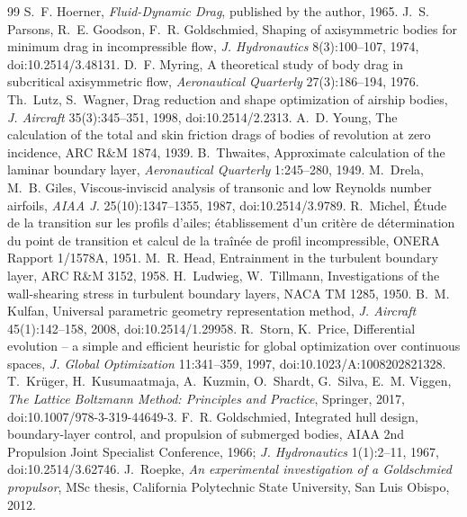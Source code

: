 \documentclass[11pt,a4paper]{article}
\begin{document}
\begin{thebibliography}{99}
 S.~F. Hoerner, \emph{Fluid-Dynamic Drag}, published by the author, 1965.
 J.~S. Parsons, R.~E. Goodson, F.~R. Goldschmied, Shaping of axisymmetric
bodies for minimum drag in incompressible flow, \emph{J. Hydronautics} 8(3):100--107, 1974,
doi:10.2514/3.48131.
 D.~F. Myring, A theoretical study of body drag in subcritical axisymmetric
flow, \emph{Aeronautical Quarterly} 27(3):186--194, 1976.
 Th.~Lutz, S.~Wagner, Drag reduction and shape optimization of airship bodies,
\emph{J. Aircraft} 35(3):345--351, 1998, doi:10.2514/2.2313.
 A.~D. Young, The calculation of the total and skin friction drags of bodies
of revolution at zero incidence, ARC R\&M 1874, 1939.
 B.~Thwaites, Approximate calculation of the laminar boundary layer,
\emph{Aeronautical Quarterly} 1:245--280, 1949.
 M.~Drela, M.~B. Giles, Viscous-inviscid analysis of transonic and low
Reynolds number airfoils, \emph{AIAA J.} 25(10):1347--1355, 1987, doi:10.2514/3.9789.
 R.~Michel, \'Etude de la transition sur les profils d'ailes; \'etablissement
d'un crit\`ere de d\'etermination du point de transition et calcul de la tra\^in\'ee de profil
incompressible, ONERA Rapport 1/1578A, 1951.
 M.~R. Head, Entrainment in the turbulent boundary layer, ARC R\&M 3152, 1958.
 H.~Ludwieg, W.~Tillmann, Investigations of the wall-shearing stress in
turbulent boundary layers, NACA TM 1285, 1950.
 B.~M. Kulfan, Universal parametric geometry representation method,
\emph{J. Aircraft} 45(1):142--158, 2008, doi:10.2514/1.29958.
 R.~Storn, K.~Price, Differential evolution -- a simple and efficient
heuristic for global optimization over continuous spaces, \emph{J. Global Optimization}
11:341--359, 1997, doi:10.1023/A:1008202821328.
 T.~Kr\"uger, H.~Kusumaatmaja, A.~Kuzmin, O.~Shardt, G.~Silva, E.~M. Viggen,
\emph{The Lattice Boltzmann Method: Principles and Practice}, Springer, 2017,
doi:10.1007/978-3-319-44649-3.
 F.~R. Goldschmied, Integrated hull design, boundary-layer
control, and propulsion of submerged bodies, AIAA 2nd Propulsion Joint Specialist Conference,
1966; \emph{J. Hydronautics} 1(1):2--11, 1967, doi:10.2514/3.62746.
 J.~Roepke, \emph{An experimental investigation of a Goldschmied
propulsor}, MSc thesis, California Polytechnic State University, San Luis Obispo, 2012.

\end{thebibliography}
\end{document}
